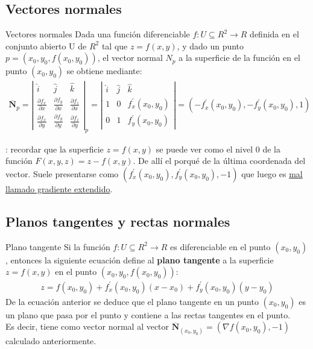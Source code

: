 \documentclass[a4paper, twoside]{article}
\numberwithin{equation}{section}
\numberwithin{figure}{section}
\numberwithin{table}{section}
\newcommand{\vect}[1]{\overline{\textbf{#1}}}
\begin{document}
\subsection{Vectores normales}
\begin{definicion*}{Vectores normales}
	Dada una función diferenciable $f:U\subseteq R^2 \rightarrow R$ definida en el conjunto abierto U de $R^2$ tal que $z=f(x,y)$, y dado un punto $p=(x_0,y_0,f(x_0,y_0))$, el vector normal $N_{p}$ a la superficie de la función en el punto $(x_0,y_0)$ se obtiene mediante:
	\begin{align}
		\vect{N}_{p}=\left|\begin{array}{ccc}
		\hat{i} & \hat{j} & \hat{k}\\
		\frac{\partial f_x}{\partial x} & \frac{\partial f_y}{\partial x} & \frac{\partial f_z}{\partial x}\\
		\frac{\partial f_x}{\partial y} & \frac{\partial f_y}{\partial y} & \frac{\partial f_z}{\partial y}\end{array}\right|_{p}=\left|\begin{array}{ccc}
		\hat{i} & \hat{j} & \hat{k}\\
		1 & 0 & f^\prime_{x}(x_0,y_0)\\
		0 & 1 & f^\prime_{y}(x_0,y_0)\end{array}\right|=(-f^\prime_{x}(x_0,y_0),-f^\prime_{y}(x_0,y_0),1)
	\end{align}
\end{definicion*}

: recordar que la superficie $z=f(x,y)$ se puede ver  como el nivel 0 de la función $F(x,y,z)=z-f(x,y)$. De allí el porqué de la última coordenada del vector. Suele presentarse como $(f^\prime_{x}(x_0,y_0),f^\prime_{y}(x_0,y_0),-1)$ que luego es \underline{mal llamado gradiente extendido}.

\subsection{Planos tangentes y rectas normales}
\begin{definicion*}{Plano tangente}
	Si la función $f:U\subseteq R^2 \rightarrow R$ es diferenciable en el punto $(x_0,y_0)$, entonces la siguiente ecuación define al \textbf{plano tangente} a la superficie $z=f(x,y)$ en el punto $(x_0,y_0,f(x_0,y_0))$:
	\begin{align}
		z=f(x_0,y_0)+f^\prime_{x}(x_0,y_0)(x-x_0)+f^\prime_{y}(x_0,y_0)(y-y_0)
	\end{align}
	De la ecuación anterior se deduce que el plano tangente en un punto $(x_0,y_0)$ es un plano que pasa por el punto y contiene a las rectas tangentes en el punto.\\
	Es decir, tiene como vector normal al vector $\vect{N}_{(x_0,y_0)}=(\nabla f(x_0,y_0),-1)$ calculado anteriormente.
\end{definicion*}
\end{document}
